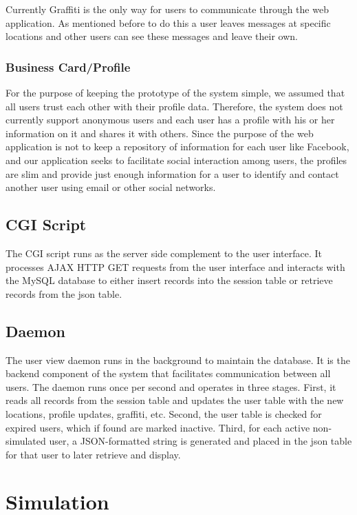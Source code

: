 \documentclass[11pt]{article}
\begin{document}
Currently Graffiti is the only way for users to communicate through the
web application. As mentioned before to do this a user leaves messages
at specific locations and other users can see these messages and leave
their own.

\subsubsection{Business Card/Profile}

For the purpose of keeping the prototype of the system simple, we
assumed that all users trust each other with their profile data.  Therefore,
the system does not currently support anonymous users and each user has 
a profile with his or her information on it and shares it with others. 
Since the purpose of the web application is not to keep a
repository of information for each user like Facebook, and our application
seeks to facilitate social interaction among users, the profiles are
slim and provide just enough information for a user to identify and contact
another user using email or other social networks.

\subsection{CGI Script}

The CGI script runs as the server side complement to the user interface.
It processes AJAX HTTP GET requests from the user interface and interacts
with the MySQL database to either insert records into the session table
or retrieve records from the json table.

\subsection{Daemon}

The user view daemon runs in the background to maintain the database.
It is the backend component of the system that facilitates communication
between all users.  The daemon runs once per second and operates in three
stages. First, it reads all records from the session table and updates
the user table with the new locations, profile updates, graffiti,
etc. Second, the user table is checked for expired users, which if
found are marked inactive.  Third, for each active non-simulated user,
a JSON-formatted string is generated and placed in the json table for
that user to later retrieve and display.


\section{Simulation}
\end{document}
